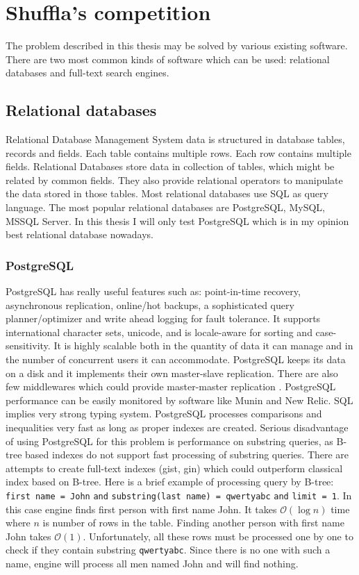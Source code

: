 \documentclass[10pt,a4paper]{article}
\newcommand{\Oh}{\mathcal{O}}
\begin{document}
\section{Shuffla's competition}
\label{chapter:competition}
The problem described in this thesis may be solved by various existing software. There are two most common kinds of software which can be used: relational databases and full-text search engines.

\subsection{Relational databases}
Relational Database Management System data is structured in database tables, records and fields. Each table contains multiple rows. Each row contains multiple fields. Relational Databases store data in collection of tables, which might be related by common fields. They also provide relational operators to manipulate the data stored in those tables. Most relational databases use SQL as query language. The most popular relational databases are PostgreSQL, MySQL, MSSQL Server. In this thesis I will only test PostgreSQL which is in my opinion best relational database nowadays.

\subsubsection{PostgreSQL}
PostgreSQL has really useful features such as: point-in-time recovery, asynchronous replication, online/hot backups, a sophisticated query planner/optimizer and write ahead logging for fault tolerance. It supports international character sets, unicode, and is locale-aware for sorting and case-sensitivity. It is highly scalable both in the quantity of data it can manage and in the number of concurrent users it can accommodate. PostgreSQL keeps its data on a disk and it implements their own master-slave replication. There are also few middlewares which could provide master-master replication \cite{PSQLREPL}. PostgreSQL performance can be easily monitored by software like Munin and New Relic. SQL implies very strong typing system. PostgreSQL processes comparisons and inequalities very fast as long as proper indexes are created. Serious disadvantage of using PostgreSQL for this problem is performance on substring queries, as B-tree based indexes do not support fast processing of substring queries. There are attempts to create full-text indexes (gist, gin) which could outperform classical index based on B-tree.
Here is a brief example of processing query by B-tree: \verb|first name = John| \verb|and| \verb|substring(last name) = qwertyabc| \verb|and| \verb|limit = 1|. In this case engine finds first person with first name John. It takes $\Oh(\log n)$ time where $n$ is number of rows in the table. Finding another person with first name John takes $\Oh(1)$. Unfortunately, all these rows must be processed one by one to check if they contain substring \verb|qwertyabc|. Since there is no one with such a name, engine will process all men named John and will find nothing.
\end{document}
